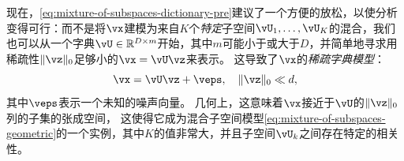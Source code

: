 \documentclass[../../book-main.tex]{subfiles}
\begin{document}
现在，\eqref{eq:mixture-of-subspaces-dictionary-pre}建议了一个方便的放松，以使分析变得可行：而不是将$\vx$建模为来自$K$个\textit{特定}子空间$\vU_1, \dots, \vU_K$的混合，我们也可以从一个字典$\vU \in \R^{D \times m}$开始，其中$m$可能小于或大于$D$，并简单地寻求用稀疏性$\norm{\vz}_0$足够小的$\vx = \vU \vz$来表示。
这导致了$\vx$的\textit{稀疏字典模型}：
\begin{equation}\label{eq:mixture-of-subspaces-dictionary}
    \vx =  \vU \vz + \veps,
    \quad
    \norm{\vz}_0 \ll d,
\end{equation}
其中$\veps$表示一个未知的噪声向量。
几何上，这意味着$\vx$接近于$\vU$的$\norm{\vz}_0$列的子集的张成空间，
这使得它成为混合子空间模型\eqref{eq:mixture-of-subspaces-geometric}的一个实例，其中$K$的值非常大，并且子空间$\vU_k$之间存在特定的相关性。

\end{document}
